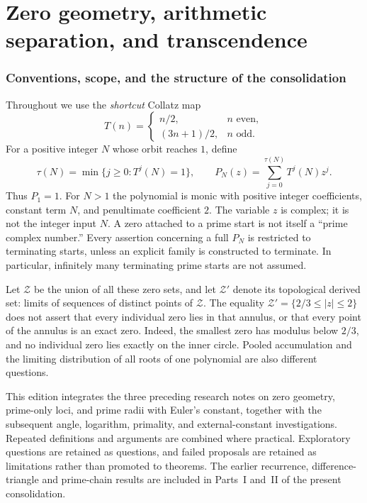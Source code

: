 \documentclass[11pt,a4paper]{article}
\theoremstyle{definition}
\theoremstyle{remark}
\numberwithin{equation}{section}
\begin{document}
\part{Zero geometry, arithmetic separation, and transcendence}\label{part:C}
\setcounter{section}{0}
\renewcommand{\thesection}{III.\arabic{section}}
\section{Conventions, scope, and the structure of the consolidation}
\label{C:sec:conventions}
Throughout we use the \emph{shortcut} Collatz map
\[
 T(n)=\begin{cases}n/2,&n\text{ even},\\(3n+1)/2,&n\text{ odd}.
 \end{cases}
\]
For a positive integer $N$ whose orbit reaches $1$, define
\[
 \tau(N)=\min\{j\ge0:T^j(N)=1\},\qquad
 P_N(z)=\sum_{j=0}^{\tau(N)}T^j(N)z^j.
\]
Thus $P_1=1$. For $N>1$ the polynomial is monic with positive integer
coefficients, constant term $N$, and penultimate coefficient $2$.
The variable $z$ is complex; it is not the integer input $N$.
A zero attached to a prime start is not itself a ``prime complex number.''
Every assertion concerning a full $P_N$ is restricted to terminating
starts, unless an explicit family is constructed to terminate.
In particular, infinitely many terminating prime starts are not assumed.

Let $\mathcal Z$ be the union of all these zero sets, and let
$\mathcal Z'$ denote its topological derived set: limits of sequences
of distinct points of $\mathcal Z$. The equality
$\mathcal Z'=\{2/3\le |z|\le2\}$ does not assert that every individual
zero lies in that annulus, or that every point of the annulus is an
exact zero. Indeed, the smallest zero has modulus below $2/3$, and no
individual zero lies exactly on the inner circle. Pooled accumulation
and the limiting distribution of all roots of one polynomial are
also different questions.

This edition integrates the three preceding research notes on zero
geometry, prime-only loci, and prime radii with Euler's constant, together
with the subsequent angle, logarithm, primality, and external-constant
investigations. Repeated definitions and arguments are combined where
practical. Exploratory questions are retained as questions, and failed
proposals are retained as limitations rather than promoted to theorems.
The earlier recurrence, difference-triangle and prime-chain results are included in Parts~I and~II of the present consolidation.
\end{document}
